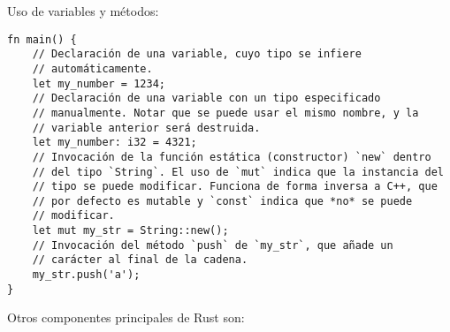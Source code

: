 Uso de variables y métodos:

\begin{verbatim}
fn main() {
    // Declaración de una variable, cuyo tipo se infiere
    // automáticamente.
    let my_number = 1234;
    // Declaración de una variable con un tipo especificado
    // manualmente. Notar que se puede usar el mismo nombre, y la
    // variable anterior será destruida.
    let my_number: i32 = 4321;
    // Invocación de la función estática (constructor) `new` dentro
    // del tipo `String`. El uso de `mut` indica que la instancia del
    // tipo se puede modificar. Funciona de forma inversa a C++, que
    // por defecto es mutable y `const` indica que *no* se puede
    // modificar.
    let mut my_str = String::new();
    // Invocación del método `push` de `my_str`, que añade un
    // carácter al final de la cadena.
    my_str.push('a');
}
\end{verbatim}

Otros componentes principales de Rust son:

